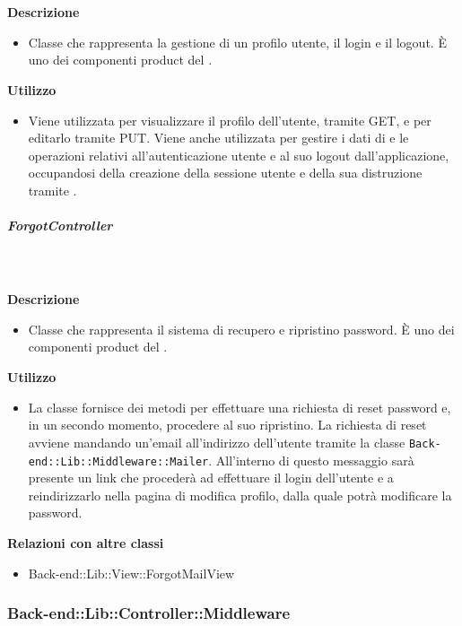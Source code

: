 				\textbf{\\ \\ Descrizione} 
					\begin{itemize}
						\item[] Classe che rappresenta la gestione di un profilo utente, il login e il logout. È uno dei componenti product del  .

					\end{itemize}      
				\textbf{Utilizzo}  
					\begin{itemize}
						\item[] Viene utilizzata per visualizzare il profilo dell'utente, tramite GET, e per editarlo tramite PUT. Viene anche utilizzata per gestire i dati di e le operazioni relativi all'autenticazione utente e al suo logout dall'applicazione, occupandosi della creazione della sessione utente e della sua distruzione tramite .
					\end{itemize}
			\subparagraph{ForgotController}
				
				\textbf{\\ \\ Descrizione} 
					\begin{itemize}
						\item[] Classe che rappresenta il sistema di recupero e ripristino password. È uno dei componenti product del  .
					\end{itemize}      
				\textbf{Utilizzo}  
					\begin{itemize}
						\item[] La classe fornisce dei metodi per effettuare una richiesta di reset password e, in un secondo momento, procedere al suo ripristino. La richiesta di reset avviene mandando un'email all'indirizzo dell'utente tramite la classe \texttt{Back-end::Lib::Middleware::Mailer}. All'interno di questo messaggio sarà presente un link che procederà ad effettuare il login dell'utente e a reindirizzarlo nella pagina di modifica profilo, dalla quale potrà modificare la password.
					\end{itemize}
					\textbf{Relazioni con altre classi}
					\begin{itemize}
							\item{Back-end::Lib::View::ForgotMailView}
					\end{itemize}
	\subsubsection{Back-end::Lib::Controller::Middleware}
